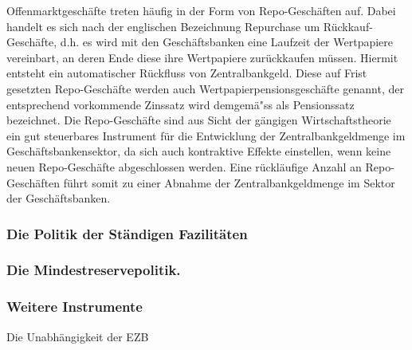 \documentclass[
    onecolumn,
    a4paper,
    abstracton,
    parskip=half
    ,final
    ]{scrartcl}
\begin{document}
Offenmarktgesch{\"a}fte treten h{\"a}ufig in der Form von Repo-Gesch{\"a}ften auf. Dabei handelt es sich nach der englischen Bezeichnung Repurchase um R{\"u}ckkauf-Gesch{\"a}fte, d.h. es wird mit den Gesch{\"a}ftsbanken eine Laufzeit der Wertpapiere vereinbart, an deren Ende diese ihre Wertpapiere zur{\"u}ckkaufen m{\"u}ssen. Hiermit entsteht ein automatischer R{\"u}ckfluss von Zentralbankgeld. Diese auf Frist gesetzten Repo-Gesch{\"a}fte werden auch Wertpapierpensionsgesch{\"a}fte genannt, der entsprechend vorkommende Zinssatz wird demgem{\"a}{"ss} als Pensionssatz bezeichnet.
Die Repo-Gesch{\"a}fte sind aus Sicht der g{\"a}ngigen Wirtschaftstheorie ein gut steuerbares Instrument f{\"u}r die Entwicklung der Zentralbankgeldmenge im Gesch{\"a}ftsbankensektor, da sich auch kontraktive Effekte einstellen, wenn keine neuen Repo-Gesch{\"a}fte abgeschlossen werden. Eine r{\"u}ckl{\"a}ufige Anzahl an Repo-Gesch{\"a}ften f{\"u}hrt somit zu einer Abnahme der Zentralbankgeldmenge im Sektor der Gesch{\"a}ftsbanken.








\subsubsection{Die Politik der St{\"a}ndigen Fazilit{\"a}ten}
\subsubsection{Die Mindestreservepolitik.}
\subsubsection{Weitere Instrumente}






Die Unabh{\"a}ngigkeit der EZB
\end{document}
